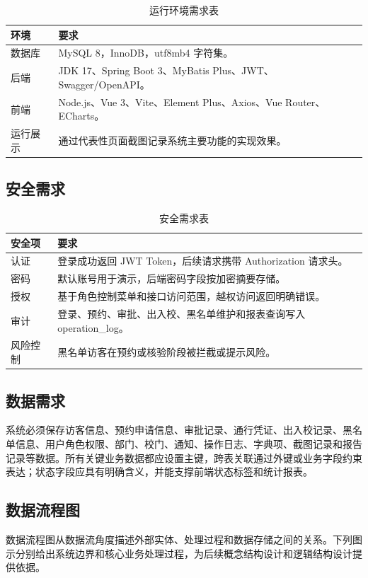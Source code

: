 \begin{longtable}{>{\raggedright\arraybackslash}p{}>{\raggedright\arraybackslash}p{}}
\caption{运行环境需求表}\\
\toprule
环境 & 要求 \\
\midrule
数据库 & MySQL 8，InnoDB，utf8mb4 字符集。 \\
后端 & JDK 17、Spring Boot 3、MyBatis Plus、JWT、Swagger/OpenAPI。 \\
前端 & Node.js、Vue 3、Vite、Element Plus、Axios、Vue Router、ECharts。 \\
运行展示 & 通过代表性页面截图记录系统主要功能的实现效果。 \\
\bottomrule
\end{longtable}\subsection{安全需求}
\begin{longtable}{>{\raggedright\arraybackslash}p{}>{\raggedright\arraybackslash}p{}}
\caption{安全需求表}\\
\toprule
安全项 & 要求 \\
\midrule
认证 & 登录成功返回 JWT Token，后续请求携带 Authorization 请求头。 \\
密码 & 默认账号用于演示，后端密码字段按加密摘要存储。 \\
授权 & 基于角色控制菜单和接口访问范围，越权访问返回明确错误。 \\
审计 & 登录、预约、审批、出入校、黑名单维护和报表查询写入 operation\_log。 \\
风险控制 & 黑名单访客在预约或核验阶段被拦截或提示风险。 \\
\bottomrule
\end{longtable}
\subsection{数据需求}
系统必须保存访客信息、预约申请信息、审批记录、通行凭证、出入校记录、黑名单信息、用户角色权限、部门、校门、通知、操作日志、字典项、截图记录和报告记录等数据。所有关键业务数据都应设置主键，跨表关联通过外键或业务字段约束表达；状态字段应具有明确含义，并能支撑前端状态标签和统计报表。

\subsection{数据流程图}
数据流程图从数据流角度描述外部实体、处理过程和数据存储之间的关系。下列图示分别给出系统边界和核心业务处理过程，为后续概念结构设计和逻辑结构设计提供依据。
